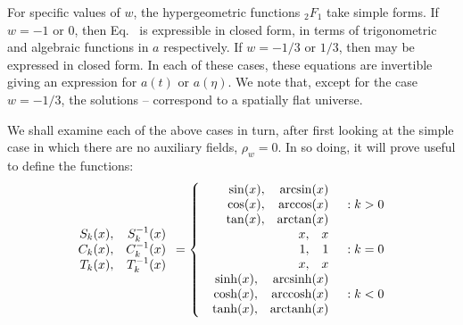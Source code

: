 For specific values of $w$, the hypergeometric functions $_2F_1$ take
simple forms. If $w=-1$ or $0$, then Eq.\  is
expressible in closed form, in terms of trigonometric and algebraic
functions in $a$ respectively. If $w=-1/3$ or $1/3$, then
 may be expressed in closed form. In each of these
cases, these equations are invertible giving an expression for $a(t)$
or $a(\eta)$.  We note that, except for the case $w=-1/3$, the
solutions -- correspond to a
spatially flat universe.

We shall examine each of the above cases in turn, after first looking
at the simple case in which there are no auxiliary fields, $\rho_w=0$.
In so doing, it will prove useful to define the functions:
%
\begin{equation}
  \begin{array}{rr}
    S_k(x),&S_k^{-1}(x)
    \\ 
    C_k(x),&C_k^{-1}(x)
    \\ 
    T_k(x),&T_k^{-1}(x)
    \\
  \end{array}
  =
  \left\{
%
  \begin{array}{rl}
%
    \begin{array}{rr}
      \sin(x),&\arcsin(x)
      \\ 
      \cos(x),&\arccos(x)
      \\ 
      \tan(x),&\arctan(x)
      \\
    \end{array}
%
    &: k>0 \\
%
    \begin{array}{rr}
      x,&x
      \\ 
      1,&1
      \\ 
      x,&x
      \\
    \end{array}
%
    &: k=0 \\
%
    \begin{array}{rr}
      \sinh(x),&\arcsinh(x)
      \\ 
      \cosh(x),&\arccosh(x)
      \\ 
      \tanh(x),&\arctanh(x)
      \\
    \end{array}
%
    &: k<0
  \end{array}
%
  \right. 
\end{equation}
%

